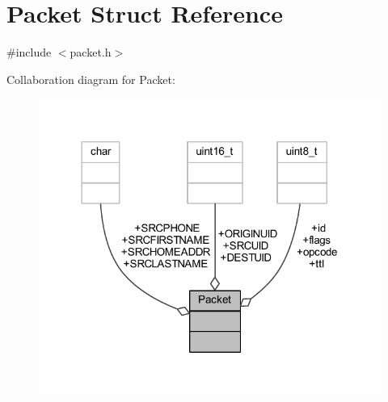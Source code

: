 \hypertarget{struct_packet}{}\section{Packet Struct Reference}
\label{struct_packet}


{\ttfamily \#include $<$packet.\+h$>$}



Collaboration diagram for Packet\+:\nopagebreak
\begin{figure}[H]
\begin{center}
\leavevmode
\includegraphics[width=318pt]{struct_packet__coll__graph}
\end{center}
\end{figure}
